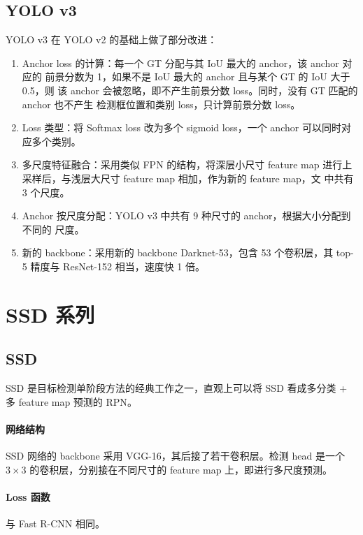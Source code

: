 \subsection{YOLO v3}
\label{subsec:YOLOv3}
YOLO v3 在 YOLO v2 的基础上做了部分改进：

\begin{enumerate}
  \item Anchor loss 的计算：每一个 GT 分配与其 IoU 最大的 anchor，该 anchor 对应的
    前景分数为 1，如果不是 IoU 最大的 anchor 且与某个 GT 的 IoU 大于 0.5，则
    该 anchor 会被忽略，即不产生前景分数 loss。同时，没有 GT 匹配的 anchor 也不产生
    检测框位置和类别 loss，只计算前景分数 loss。
  \item Loss 类型：将 Softmax loss 改为多个 sigmoid loss，一个 anchor 可以同时对
    应多个类别。
  \item 多尺度特征融合：采用类似 FPN\cite{2016-FPN} 的结构，将深层小尺寸 feature
    map 进行上采样后，与浅层大尺寸 feature map 相加，作为新的 feature map，文
    中共有 3 个尺度。
  \item Anchor 按尺度分配：YOLO v3 中共有 9 种尺寸的 anchor，根据大小分配到不同的
    尺度。
  \item 新的 backbone：采用新的 backbone Darknet-53，包含 53 个卷积层，其 top-5
    精度与 ResNet-152 相当，速度快 1 倍。
\end{enumerate}

\section{SSD 系列}
\label{sec:SSD}

\subsection{SSD}
\label{subsec:SSD}

SSD 是目标检测单阶段方法的经典工作之一，直观上可以将 SSD 看成多分类 + 多 feature
map 预测的 RPN\cite{2015-SSD}。

\paragraph{网络结构}
SSD 网络的 backbone 采用 VGG-16，其后接了若干卷积层。检测 head 是一个 $3 \times
3$ 的卷积层，分别接在不同尺寸的 feature map 上，即进行多尺度预测。

\paragraph{Loss 函数}
与 Fast R-CNN 相同。

